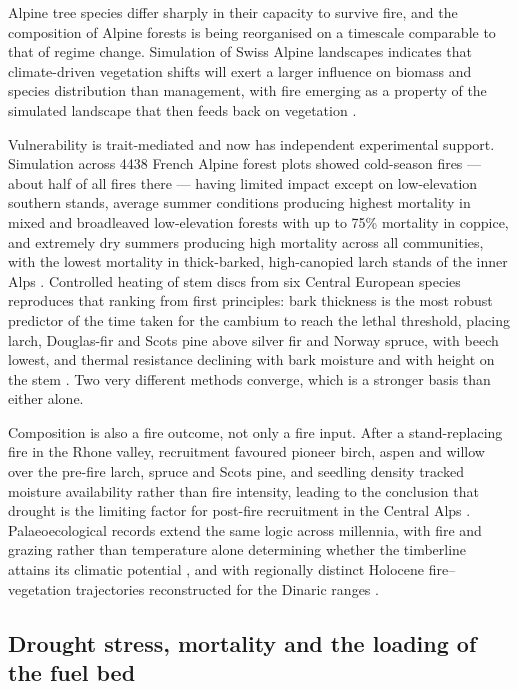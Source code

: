 \documentclass[11pt,a4paper]{article}
\begin{document}
Alpine tree species differ sharply in their capacity to survive fire, and the composition of Alpine forests is being reorganised on a timescale comparable to that of regime change. Simulation of Swiss Alpine landscapes indicates that climate-driven vegetation shifts will exert a larger influence on biomass and species distribution than management, with fire emerging as a property of the simulated landscape that then feeds back on vegetation \citep{schumacher_relative_2006}.

Vulnerability is trait-mediated and now has independent experimental support. Simulation across 4438 French Alpine forest plots showed cold-season fires --- about half of all fires there --- having limited impact except on low-elevation southern stands, average summer conditions producing highest mortality in mixed and broadleaved low-elevation forests with up to 75\% mortality in coppice, and extremely dry summers producing high mortality across all communities, with the lowest mortality in thick-barked, high-canopied larch stands of the inner Alps \citep{dupire_vulnerability_2019}. Controlled heating of stem discs from six Central European species reproduces that ranking from first principles: bark thickness is the most robust predictor of the time taken for the cambium to reach the lethal threshold, placing larch, Douglas-fir and Scots pine above silver fir and Norway spruce, with beech lowest, and thermal resistance declining with bark moisture and with height on the stem \citep{mutterer_bark_2026}. Two very different methods converge, which is a stronger basis than either alone.

Composition is also a fire outcome, not only a fire input. After a stand-replacing fire in the Rhone valley, recruitment favoured pioneer birch, aspen and willow over the pre-fire larch, spruce and Scots pine, and seedling density tracked moisture availability rather than fire intensity, leading to the conclusion that drought is the limiting factor for post-fire recruitment in the Central Alps \citep{moser_potential_2010}. Palaeoecological records extend the same logic across millennia, with fire and grazing rather than temperature alone determining whether the timberline attains its climatic potential \citep{colombaroli_species_2010}, and with regionally distinct Holocene fire--vegetation trajectories reconstructed for the Dinaric ranges \citep{cagliero_effect_nodate}.

\subsection{Drought stress, mortality and the loading of the fuel bed}
\end{document}
